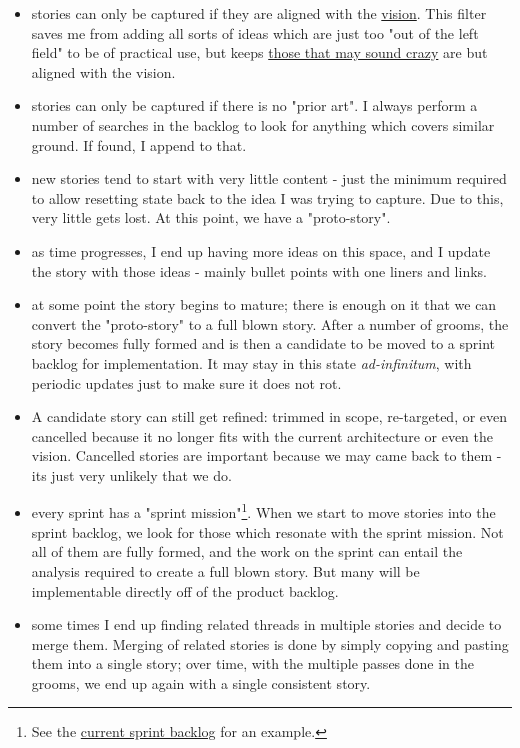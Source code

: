 \documentclass{book}
\begin{document}
\begin{itemize}
\item stories can only be captured if they are aligned with the
\href{https://github.com/DomainDrivenConsulting/dogen/blob/master/doc/agile/vision.org}{vision}. This filter saves me from adding all sorts of ideas which
are just too "out of the left field" to be of practical use, but
keeps \href{https://github.com/DomainDrivenConsulting/dogen/blob/master/doc/agile/product_backlog.org#visionary-work-and-random-ideas}{those that may sound crazy} are but aligned with the vision.
\item stories can only be captured if there is no "prior art". I always
perform a number of searches in the backlog to look for anything
which covers similar ground. If found, I append to that.
\item new stories tend to start with very little content - just the
minimum required to allow resetting state back to the idea I was
trying to capture. Due to this, very little gets lost. At this
point, we have a "proto-story".
\item as time progresses, I end up having more ideas on this space, and I
update the story with those ideas - mainly bullet points with one
liners and links.
\item at some point the story begins to mature; there is enough on it that
we can convert the "proto-story" to a full blown story. After a
number of grooms, the story becomes fully formed and is then a
candidate to be moved to a sprint backlog for implementation. It may
stay in this state \emph{ad-infinitum}, with periodic updates just to
make sure it does not rot.
\item A candidate story can still get refined: trimmed in scope,
re-targeted, or even cancelled because it no longer fits with the
current architecture or even the vision. Cancelled stories are
important because we may came back to them - its just very unlikely
that we do.
\item every sprint has a "sprint mission"\footnote{See the \href{https://github.com/DomainDrivenConsulting/dogen/blob/master/doc/agile/sprint_backlog_78.org}{current sprint backlog} for an example.}. When we start to
move stories into the sprint backlog, we look for those which
resonate with the sprint mission. Not all of them are fully formed,
and the work on the sprint can entail the analysis required to
create a full blown story. But many will be implementable directly
off of the product backlog.
\item some times I end up finding related threads in multiple stories and
decide to merge them. Merging of related stories is done by simply
copying and pasting them into a single story; over time, with the
multiple passes done in the grooms, we end up again with a single
consistent story.
\end{itemize}
\end{document}

